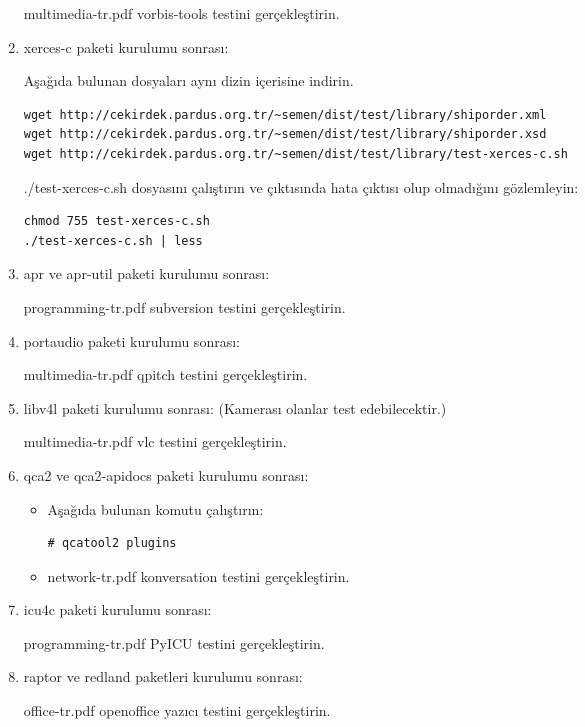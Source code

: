 \documentclass[a4paper,10pt]{article}
\begin{document}
\begin{enumerate}
multimedia-tr.pdf vorbis-tools testini gerçekleştirin.

\item xerces-c paketi kurulumu sonrası:

Aşağıda bulunan dosyaları aynı dizin içerisine indirin.
\begin{verbatim}
wget http://cekirdek.pardus.org.tr/~semen/dist/test/library/shiporder.xml
wget http://cekirdek.pardus.org.tr/~semen/dist/test/library/shiporder.xsd
wget http://cekirdek.pardus.org.tr/~semen/dist/test/library/test-xerces-c.sh
\end{verbatim}

./test-xerces-c.sh dosyasını çalıştırın ve çıktısında hata çıktısı olup olmadığını gözlemleyin:
\begin{verbatim}
chmod 755 test-xerces-c.sh
./test-xerces-c.sh | less
\end{verbatim}

\item apr ve apr-util paketi kurulumu sonrası:

programming-tr.pdf subversion testini gerçekleştirin.

\item portaudio paketi kurulumu sonrası:

multimedia-tr.pdf qpitch testini gerçekleştirin.

\item libv4l paketi kurulumu sonrası: (Kamerası olanlar test edebilecektir.)


multimedia-tr.pdf vlc testini gerçekleştirin.

\item qca2 ve qca2-apidocs paketi kurulumu sonrası:
\begin{itemize}
 \item Aşağıda bulunan komutu çalıştırın:
\begin{verbatim}
# qcatool2 plugins 
\end{verbatim}
\item network-tr.pdf konversation testini gerçekleştirin.
\end{itemize}


\item icu4c paketi kurulumu sonrası:

programming-tr.pdf PyICU testini gerçekleştirin.

\item raptor ve redland paketleri kurulumu sonrası:

office-tr.pdf openoffice yazıcı testini gerçekleştirin.


\end{enumerate}
\end{document}
